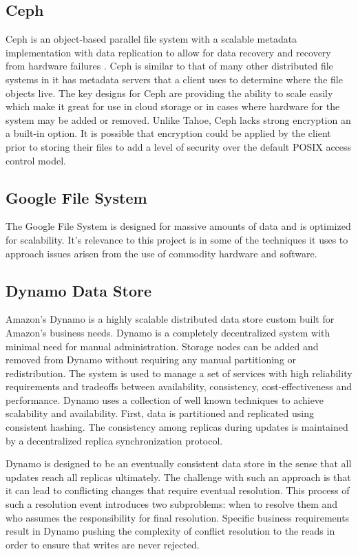 \documentclass[11pt]{article}
\begin{document}
\subsection{Ceph}
Ceph is an object-based parallel file system with a scalable metadata
implementation with data replication to allow for data recovery and
recovery from hardware failures
\cite{Weil:2012p1035,Weil:2012p1010,Weil:2006p1273}.
Ceph is similar to that of many other
distributed file systems in it has metadata servers that a client uses
to determine where the file objects live. The key designs for Ceph are
providing the ability to scale easily which make it great for use in
cloud storage or in cases where hardware for the system may be added
or removed. Unlike Tahoe, Ceph lacks strong encryption an a built-in
option. It is
possible that encryption could be applied by the client prior to
storing their files to add a level of security over the default POSIX
access control model.

\subsection{Google File System}
The Google File System is designed for massive amounts of data and is 
optimized for scalability. It's relevance to this project is in some 
of the techniques it uses to approach issues arisen from the use of 
commodity hardware and software.

\subsection{Dynamo Data Store}
Amazon's Dynamo is a highly scalable distributed data store custom
built for Amazon’s business needs. Dynamo is a completely
decentralized system with minimal need for manual
administration. Storage nodes can be added and removed from Dynamo
without requiring any manual partitioning or redistribution. The
system is used to manage a set of services with high reliability
requirements and tradeoffs between availability, consistency,
cost-effectiveness and performance. Dynamo uses a collection of well
known techniques to achieve scalability and availability. First, data
is partitioned and replicated using consistent hashing. The
consistency among replicas during updates is maintained by a
decentralized replica synchronization protocol.

Dynamo is designed to be an eventually consistent data store in the
sense that all updates reach all replicas ultimately. The challenge
with such an approach is that it can lead to conflicting changes that
require eventual resolution. This process of such a resolution event
introduces two subproblems: when to resolve them and who assumes the
responsibility for final resolution. Specific business requirements
result in Dynamo pushing the complexity of conflict resolution to the
reads in order to ensure that writes are never rejected.
\end{document}
